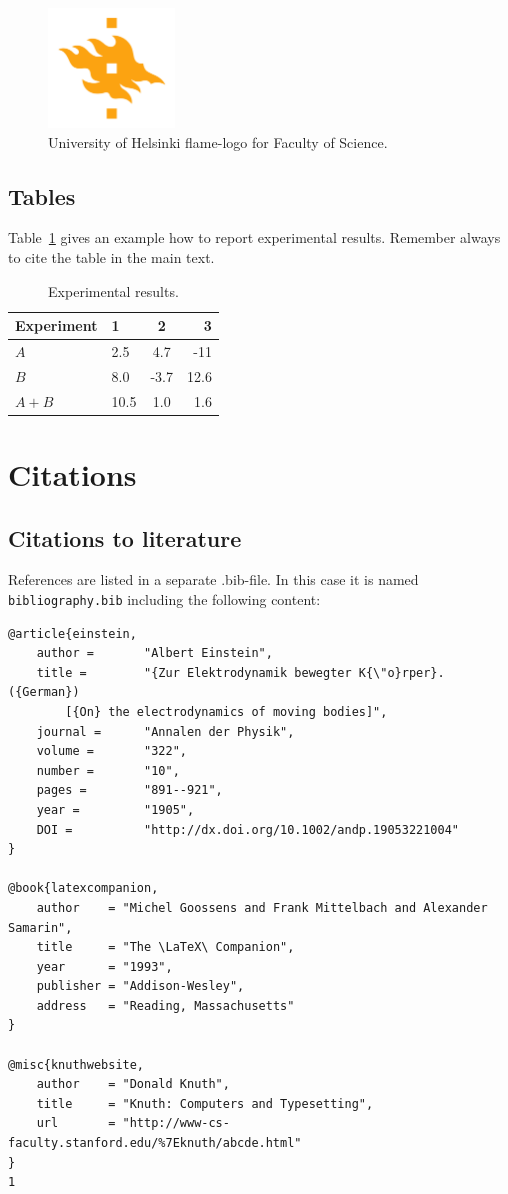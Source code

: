 \begin{figure}[h!] 
\centering 
\includegraphics[width=0.3\textwidth]{HY-logo-ml.png}
\caption{University of Helsinki flame-logo for Faculty of Science.\label{fig:logo}}
\end{figure}

\section{Tables}

Table~\ref{table:results} gives an example how to report experimental results. Remember always to cite the table in the main text. 

\begin{table}
\centering
\caption{Experimental results.\label{table:results}}
\begin{tabular}{l||l c r} 
Experiment & 1 & 2 & 3 \\ 
\hline \hline 
$A$ & 2.5 & 4.7 & -11 \\
$B$ & 8.0 & -3.7 & 12.6 \\
$A+B$ & 10.5 & 1.0 & 1.6 \\
\hline
%
\end{tabular}
\end{table}

\chapter{Citations}

\section{Citations to literature}

References are listed in a separate .bib-file. In this case it is named \texttt{bibliography.bib} including the following content:
\begin{verbatim}
@article{einstein,
    author =       "Albert Einstein",
    title =        "{Zur Elektrodynamik bewegter K{\"o}rper}. ({German})
        [{On} the electrodynamics of moving bodies]",
    journal =      "Annalen der Physik",
    volume =       "322",
    number =       "10",
    pages =        "891--921",
    year =         "1905",
    DOI =          "http://dx.doi.org/10.1002/andp.19053221004"
}
 
@book{latexcompanion,
    author    = "Michel Goossens and Frank Mittelbach and Alexander Samarin",
    title     = "The \LaTeX\ Companion",
    year      = "1993",
    publisher = "Addison-Wesley",
    address   = "Reading, Massachusetts"
}
 
@misc{knuthwebsite,
    author    = "Donald Knuth",
    title     = "Knuth: Computers and Typesetting",
    url       = "http://www-cs-faculty.stanford.edu/%7Eknuth/abcde.html"
}
1
\end{verbatim}


